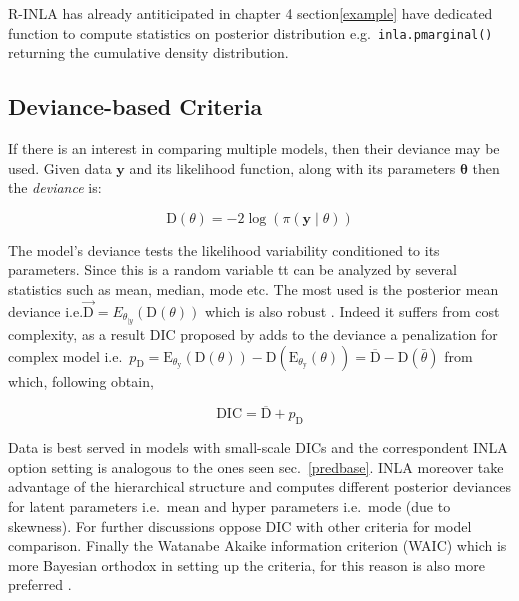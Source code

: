 \documentclass[
  12pt,
  a4paper,
  oneside]{book}
\newcommand{\passthrough}[1]{#1}
\theoremstyle{definition}
\theoremstyle{definition}
\theoremstyle{definition}
\theoremstyle{remark}
\begin{document}
R-INLA has already antiticipated in chapter 4 section\ref{example} have dedicated function to compute statistics on posterior distribution e.g.~\passthrough{\lstinline!inla.pmarginal()!} returning the cumulative density distribution.

\hypertarget{devbased}{%
\subsection{Deviance-based Criteria}\label{devbased}}

If there is an interest in comparing multiple models, then their deviance may be used. Given data \(\boldsymbol{y}\) and its likelihood function, along with its parameters \(\boldsymbol\theta\) then the \emph{deviance} is:

\[
\mathrm{D}(\theta)=-2 \log (\pi(\boldsymbol{y} \mid \theta))
\]

The model's deviance tests the likelihood variability conditioned to its parameters. Since this is a random variable tt can be analyzed by several statistics such as mean, median, mode etc. The most used is the posterior mean deviance i.e.\(\overrightarrow{\mathrm{D}}=E_{\theta_{\mid y}}(\mathrm{D}(\theta))\) which is also robust \citep{Blangiaro-Cameletti}. Indeed it suffers from cost complexity, as a result DIC proposed by \citet{spiegelhalter2002bayesian} adds to the deviance a penalization for complex model i.e.~\(p_{\mathrm{D}}=\mathrm{E}_{\theta_{\mathrm{y}}}(\mathrm{D}(\theta))-\mathrm{D}\left(\mathrm{E}_{\theta_{\mathrm{y}}}(\theta)\right)=\overline{\mathrm{D}}-\mathrm{D}(\bar{\theta})\) from which, following \citet{Blangiaro-Cameletti} obtain,

\begin{equation}
  \mathrm{DIC}=\overline{\mathrm{D}}+p_{\mathrm{D}}
\label{eq:dic}
\end{equation}

Data is best served in models with small-scale DICs and the correspondent INLA option setting is analogous to the ones seen sec.~\ref{predbase}. INLA moreover take advantage of the hierarchical structure and computes different posterior deviances for latent parameters i.e.~mean and hyper parameters i.e.~mode (due to skewness). For further discussions \citet{spiegelhalter2014deviance} oppose DIC with other criteria for model comparison. Finally the Watanabe Akaike information criterion (WAIC) which is more Bayesian orthodox in setting up the criteria, for this reason is also more preferred \citep{gelman2014understanding}.
\end{document}
